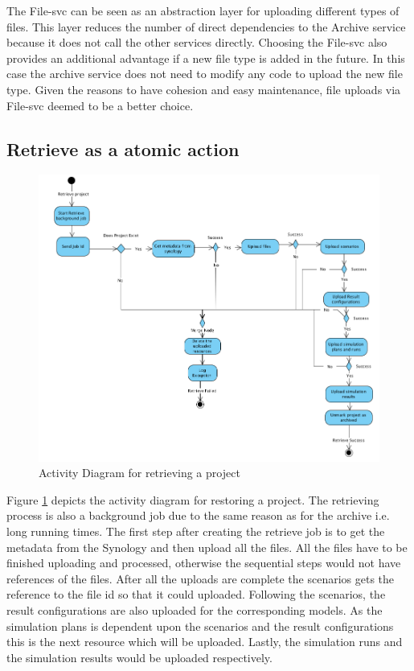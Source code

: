 The File-svc can be seen as an abstraction layer for uploading different types of files. This layer reduces the number of direct dependencies to the Archive
service because it does not call the other services directly. Choosing the File-svc also provides an additional advantage if a new file type is added in the future.
In this case the archive service does not need to modify any code to upload the new file type. Given the reasons to have cohesion and easy maintenance, file uploads
via File-svc deemed to be a better choice. 

\subsection{Retrieve as a atomic action}
\begin{figure}[H]
    \centering \includegraphics[scale=0.45]{grafiken/restoreActivity.png}
    \caption{Activity Diagram for retrieving a project}
    \label{fig:activityRestore}
\end{figure}

Figure \ref{fig:activityRestore} depicts the activity diagram for restoring a project. The retrieving process is also a background job due to the same reason
as for the archive i.e. long running times. The first step after creating the retrieve job is to get the metadata from the Synology and then upload all the files.
All the files have to be finished uploading and processed, otherwise the sequential steps would not have references of the files. After all the uploads are complete
the scenarios gets the reference to the file id so that it could uploaded. Following the scenarios, the result configurations are also uploaded for the corresponding models.
As the simulation plans is dependent upon the scenarios and the result configurations this is the next resource which will be uploaded. Lastly, the simulation runs
and the simulation results would be uploaded respectively. 

